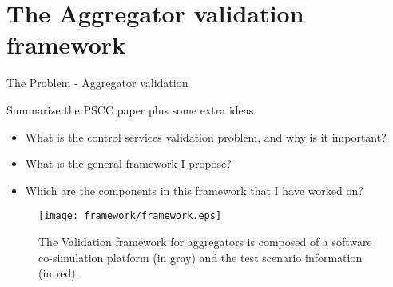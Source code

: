 \chapter{The Aggregator validation framework}
The Problem -  Aggregator validation

Summarize the PSCC paper plus some extra ideas

\begin{itemize}
	\item What is the control services validation problem, and why is it important?
	\item What is the general framework I propose?
	\item Which are the components in this framework that I have worked on?
\end{itemize}
\begin{figure}[ht]
	\centering
	\caption{The Validation framework for aggregators is composed of a software co-simulation platform (in gray) and the test scenario information (in red). }
	\texttt{[image: framework/framework.eps]}\label{fig:frameworkbig}
\end{figure}

